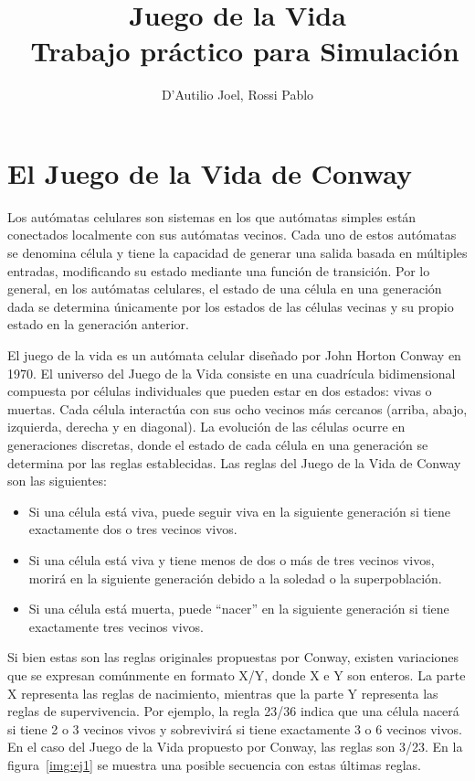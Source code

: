 \documentclass[12pt]{article}
\title{Juego de la Vida\\
\large~Trabajo práctico para Simulación}
\author{D'Autilio Joel, Rossi Pablo}
\date{}
\begin{document}
\maketitle


\section{El Juego de la Vida de Conway}


Los autómatas celulares son sistemas en los que autómatas simples están conectados localmente con sus autómatas vecinos. Cada uno de estos autómatas se denomina célula y tiene la capacidad de generar una salida basada en múltiples entradas, modificando su estado mediante una función de transición. Por lo general, en los autómatas celulares, el estado de una célula en una generación dada se determina únicamente por los estados de las células vecinas y su propio estado en la generación anterior.

El juego de la vida es un autómata celular diseñado por John Horton Conway en 1970. El universo del Juego de la Vida consiste en una cuadrícula bidimensional compuesta por células individuales que pueden estar en dos estados: vivas o muertas. Cada célula interactúa con sus ocho vecinos más cercanos (arriba, abajo, izquierda, derecha y en diagonal). La evolución de las células ocurre en generaciones discretas, donde el estado de cada célula en una generación se determina por las reglas establecidas. Las reglas del Juego de la Vida de Conway son las siguientes: 

\begin{itemize}
  \item Si una célula está viva, puede seguir viva en la siguiente generación si tiene exactamente dos o tres vecinos vivos. 
  \item Si una célula está viva y tiene menos de dos o más de tres vecinos vivos, morirá en la siguiente generación debido a la soledad o la superpoblación.
  \item Si una célula está muerta, puede ``nacer'' en la siguiente generación si tiene exactamente tres vecinos vivos.
\end{itemize}

Si bien estas son las reglas originales propuestas por Conway, existen variaciones que se expresan comúnmente en formato X/Y, donde X e Y son enteros. La parte X representa las reglas de nacimiento, mientras que la parte Y representa las reglas de supervivencia. Por ejemplo, la regla 23/36 indica que una célula nacerá si tiene 2 o 3 vecinos vivos y sobrevivirá si tiene exactamente 3 o 6 vecinos vivos. En el caso del Juego de la Vida propuesto por Conway, las reglas son 3/23. En la figura~\ref{img:ej1} se muestra una posible secuencia con estas últimas reglas.
\end{document}
